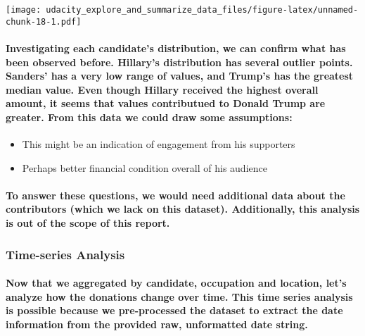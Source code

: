 \documentclass[]{article}
\providecommand{\tightlist}{%
  \setlength{\itemsep}{0pt}\setlength{\parskip}{0pt}}
\let\oldparagraph\paragraph
\renewcommand{\paragraph}[1]{\oldparagraph{#1}\mbox{}}
\begin{document}
\texttt{[image: udacity\_explore\_and\_summarize\_data\_files/figure-latex/unnamed-chunk-18-1.pdf]}

\paragraph{Investigating each candidate's distribution, we can confirm
what has been observed before. Hillary's distribution has several
outlier points. Sanders' has a very low range of values, and Trump's has
the greatest median value. Even though Hillary received the highest
overall amount, it seems that values contributued to Donald Trump are
greater. From this data we could draw some
assumptions:}\label{investigating-each-candidates-distribution-we-can-confirm-what-has-been-observed-before.-hillarys-distribution-has-several-outlier-points.-sanders-has-a-very-low-range-of-values-and-trumps-has-the-greatest-median-value.-even-though-hillary-received-the-highest-overall-amount-it-seems-that-values-contributued-to-donald-trump-are-greater.-from-this-data-we-could-draw-some-assumptions}

\begin{itemize}
\tightlist
\item
  This might be an indication of engagement from his supporters
\item
  Perhaps better financial condition overall of his audience\\
\end{itemize}

\paragraph{To answer these questions, we would need additional data
about the contributors (which we lack on this dataset). Additionally,
this analysis is out of the scope of this
report.}\label{to-answer-these-questions-we-would-need-additional-data-about-the-contributors-which-we-lack-on-this-dataset.-additionally-this-analysis-is-out-of-the-scope-of-this-report.}

\subsubsection{Time-series Analysis}\label{time-series-analysis}

\paragraph{Now that we aggregated by candidate, occupation and location,
let's analyze how the donations change over time. This time series
analysis is possible because we pre-processed the dataset to extract the
date information from the provided raw, unformatted date
string.}\label{now-that-we-aggregated-by-candidate-occupation-and-location-lets-analyze-how-the-donations-change-over-time.-this-time-series-analysis-is-possible-because-we-pre-processed-the-dataset-to-extract-the-date-information-from-the-provided-raw-unformatted-date-string.}
\end{document}
